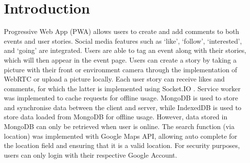 \documentclass[11pt, a4paper]{article}
\begin{document}
\section{Introduction}
Progressive Web App (PWA) allows users to create and add comments to both events and user stories.
Social media features such as `like', `follow', `interested', and `going' are integrated. Users are
able to tag an event along with their stories, which will then appear in the event page. Users can
create a story by taking a picture with their front or environment camera through the implementation
of WebRTC or upload a picture locally. Each user story can receive likes and comments, for which the
latter is implemented using Socket.IO \cite{week6, socketio}. Service worker was implemented to
cache requests for offline usage. MongoDB is used to store and synchronise data between the client
and server, while IndexedDB is used to store data loaded from MongoDB for offline usage. However,
data stored in MongoDB can only be retrieved when user is online. The search function (via location)
was implemented with Google Maps API, allowing auto complete for the location field and ensuring
that it is a valid location. For security purposes, users can only login with their respective
Google Account.
\end{document}
